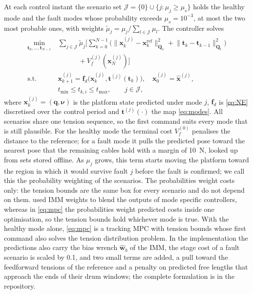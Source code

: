 \documentclass[a4paper,fleqn]{cas-dc}
\newcommand{\vc}[1]{\bm{#1}}
\newcommand{\mt}[1]{\mathbf{#1}}
\begin{document}
At each control instant the scenario set $\mathcal J=\{0\}\cup\{j:\mu_j\ge\mu_s\}$ holds the healthy mode and the fault modes whose probability exceeds $\mu_s=10^{-3}$, at most the two most probable ones, with weights $\tilde\mu_j=\mu_j/\sum_{l\in\mathcal J}\mu_l$. The controller solves
\begin{equation}\label{eq:mpc}
\begin{aligned}
\min_{\vc t_0,\dots,\vc t_{N-1}}\ &\sum_{j\in\mathcal J}\tilde\mu_j\Big[\sum_{k=0}^{N-1}\big(\lVert\vc x^{(j)}_k-\vc x^{\mathrm{ref}}_k\rVert^2_{\mt Q_x}+\lVert\vc t_k-\vc t_{k-1}\rVert^2_{\mt Q_t}\big)\\
&\qquad\quad+V_f^{(j)}(\vc x^{(j)}_N)\Big]\\
\text{s.t.}\ &\vc x^{(j)}_{k+1}=\vc f_d\big(\vc x^{(j)}_k,\vc t^{(j)}(\vc t_k)\big),\quad\vc x^{(j)}_0=\hat{\vc x}^{(j)},\\
&t_{\min}\le t_{k,i}\le t_{\max},\qquad j\in\mathcal J,
\end{aligned}
\end{equation}
where $\vc x^{(j)}_k=(\vc q,\vc\nu)$ is the platform state predicted under mode $j$, $\vc f_d$ is \eqref{eq:NE} discretised over the control period and $\vc t^{(j)}(\cdot)$ the map \eqref{eq:modes}. All scenarios share one tension sequence, so the first command suits every mode that is still plausible. For the healthy mode the terminal cost $V_f^{(0)}$ penalises the distance to the reference; for a fault mode it pulls the predicted pose toward the nearest pose that the remaining cables hold with a margin of 10~N, looked up from sets stored offline. As $\mu_j$ grows, this term starts moving the platform toward the region in which it would survive fault $j$ before the fault is confirmed; we call this the probability weighting of the scenarios. The probabilities weight costs only: the tension bounds are the same box for every scenario and do not depend on them. \citet{raman2023cable} used IMM weights to blend the outputs of mode specific controllers, whereas in \eqref{eq:mpc} the probabilities weight predicted costs inside one optimisation, so the tension bounds hold whichever mode is true. With the healthy mode alone, \eqref{eq:mpc} is a tracking MPC with tension bounds whose first command also solves the tension distribution problem. In the implementation the predictions also carry the bias wrench $\hat{\vc w}_b$ of the IMM, the stage cost of a fault scenario is scaled by 0.1, and two small terms are added, a pull toward the feedforward tensions of the reference and a penalty on predicted free lengths that approach the ends of their drum windows; the complete formulation is in the repository.
\end{document}
